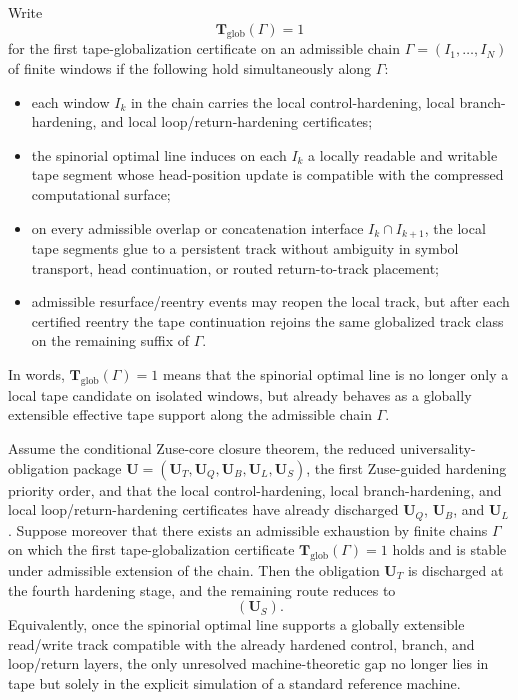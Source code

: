 \begin{definition}
Write
\[
\mathbf T_{\mathrm{glob}}(\Gamma)=1
\]
for the first tape-globalization certificate on an admissible chain $\Gamma=(I_1,\dots,I_N)$ of finite windows if the following hold simultaneously along $\Gamma$:
\begin{itemize}[leftmargin=2em]
  \item each window $I_k$ in the chain carries the local control-hardening, local branch-hardening, and local loop/return-hardening certificates;
  \item the spinorial optimal line induces on each $I_k$ a locally readable and writable tape segment whose head-position update is compatible with the compressed computational surface;
  \item on every admissible overlap or concatenation interface $I_k\cap I_{k+1}$, the local tape segments glue to a persistent track without ambiguity in symbol transport, head continuation, or routed return-to-track placement;
  \item admissible resurface/reentry events may reopen the local track, but after each certified reentry the tape continuation rejoins the same globalized track class on the remaining suffix of $\Gamma$.
\end{itemize}
In words, $\mathbf T_{\mathrm{glob}}(\Gamma)=1$ means that the spinorial optimal line is no longer only a local tape candidate on isolated windows, but already behaves as a globally extensible effective tape support along the admissible chain $\Gamma$.
\end{definition}

\begin{proposition}
Assume the conditional Zuse-core closure theorem, the reduced universality-obligation package \(\mathbf U=(\mathbf U_T,\mathbf U_Q,\mathbf U_B,\mathbf U_L,\mathbf U_S)\), the first Zuse-guided hardening priority order, and that the local control-hardening, local branch-hardening, and local loop/return-hardening certificates have already discharged \(\mathbf U_Q\), \(\mathbf U_B\), and \(\mathbf U_L\). Suppose moreover that there exists an admissible exhaustion by finite chains \(\Gamma\) on which the first tape-globalization certificate \(\mathbf T_{\mathrm{glob}}(\Gamma)=1\) holds and is stable under admissible extension of the chain. Then the obligation \(\mathbf U_T\) is discharged at the fourth hardening stage, and the remaining route reduces to
\[
(\mathbf U_S).
\]
Equivalently, once the spinorial optimal line supports a globally extensible read/write track compatible with the already hardened control, branch, and loop/return layers, the only unresolved machine-theoretic gap no longer lies in tape but solely in the explicit simulation of a standard reference machine.
\end{proposition}

